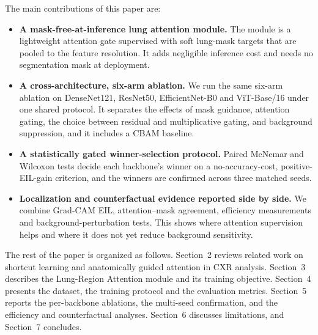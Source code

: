 The main contributions of this paper are:
\begin{itemize}
\item \textbf{A mask-free-at-inference lung attention module.} The module is a lightweight attention gate supervised with soft lung-mask targets that are pooled to the feature resolution. It adds negligible inference cost and needs no segmentation mask at deployment.
\item \textbf{A cross-architecture, six-arm ablation.} We run the same six-arm ablation on DenseNet121, ResNet50, EfficientNet-B0 and ViT-Base/16 under one shared protocol. It separates the effects of mask guidance, attention gating, the choice between residual and multiplicative gating, and background suppression, and it includes a CBAM baseline.
\item \textbf{A statistically gated winner-selection protocol.} Paired McNemar and Wilcoxon tests decide each backbone's winner on a no-accuracy-cost, positive-EIL-gain criterion, and the winners are confirmed across three matched seeds.
\item \textbf{Localization and counterfactual evidence reported side by side.} We combine Grad-CAM EIL, attention--mask agreement, efficiency measurements and background-perturbation tests. This shows where attention supervision helps and where it does not yet reduce background sensitivity.
\end{itemize}

The rest of the paper is organized as follows. Section~2 reviews related work on shortcut learning and anatomically guided attention in CXR analysis. Section~3 describes the Lung-Region Attention module and its training objective. Section~4 presents the dataset, the training protocol and the evaluation metrics. Section~5 reports the per-backbone ablations, the multi-seed confirmation, and the efficiency and counterfactual analyses. Section~6 discusses limitations, and Section~7 concludes.